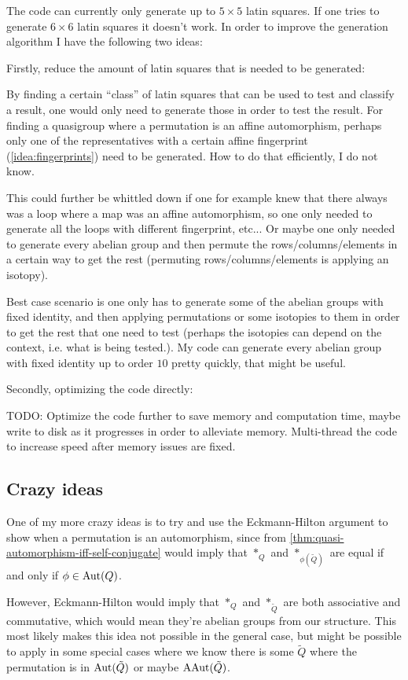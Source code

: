 \begin{idea}
    The code can currently only generate up to \( 5 \times 5 \) latin squares. If one tries to generate \( 6 \times 6 \) latin squares it doesn't work. In order to improve the generation algorithm I have the following two ideas:
    
    Firstly, reduce the amount of latin squares that is needed to be generated:

    By finding a certain ``class'' of latin squares that can be used to test and classify a result, one would only need to generate those in order to test the result. For finding a quasigroup where a permutation is an affine automorphism, perhaps only one of the representatives with a certain affine fingerprint (\autoref{idea:fingerprints}) need to be generated. How to do that efficiently, I do not know. 
    
    This could further be whittled down if one for example knew that there always was a loop where a map was an affine automorphism, so one only needed to generate all the loops with different fingerprint, etc... Or maybe one only needed to generate every abelian group and then permute the rows/columns/elements in a certain way to get the rest (permuting rows/columns/elements is applying an isotopy).
    
    Best case scenario is one only has to generate some of the abelian groups with fixed identity, and then applying permutations or some isotopies to them in order to get the rest that one need to test (perhaps the isotopies can depend on the context, i.e. what is being tested.). My code can generate every abelian group with fixed identity up to order \( 10 \) pretty quickly, that might be useful.

    Secondly, optimizing the code directly:

    TODO: Optimize the code further to save memory and computation time, maybe write to disk as it progresses in order to alleviate memory. Multi-thread the code to increase speed after memory issues are fixed.
\end{idea}

\subsection{Crazy ideas}

\begin{idea}
    One of my more crazy ideas is to try and use the Eckmann-Hilton argument to show when a permutation is an automorphism, since from \autoref{thm:quasi-automorphism-iff-self-conjugate} would imply that \( *_Q \) and \( *_{\phi(\tilde{Q})} \) are equal if and only if \( \phi \in \operatorname{Aut}(Q) \). 
    
    However, Eckmann-Hilton would imply that \( *_Q \) and \( *_{\tilde{Q}} \) are both associative and commutative, which would mean they're abelian groups from our structure. This most likely makes this idea not possible in the general case, but might be possible to apply in some special cases where we know there is some \( \tilde{Q} \) where the permutation is in \( \operatorname{Aut}(\tilde{Q}) \) or maybe \( \operatorname{AAut}(\tilde{Q}) \).
\end{idea}

